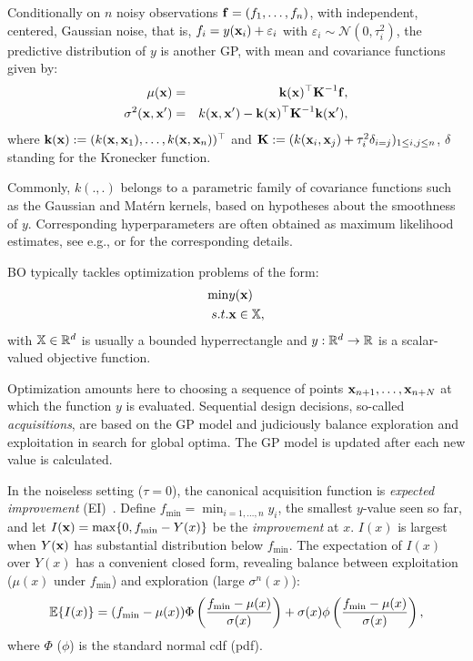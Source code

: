 Conditionally on $n$ noisy observations $\mathbf{f} = (f_1, \ldots, f_n)$, with independent, centered, Gaussian noise,
that is, $f_i = y(\mathbf{x}_i) + \varepsilon_i$ with $\varepsilon_i \sim \mathcal{N}(0, \tau_i^2)$,
the predictive distribution of $y$ is another GP, with mean and covariance functions given by:
\begin{eqnarray}
\mu(\mathbf{x}) & =& \textbf{k}(\mathbf{x})^\top \textbf{K}^{-1} \mathbf{f},  \\
\sigma^2(\mathbf{x}, \mathbf{x}') & =& k(\mathbf{x}, \mathbf{x}') - \textbf{k}(\mathbf{x})^\top \textbf{K}^{-1} \textbf{k}(\mathbf{x}'),
\end{eqnarray}
where $\textbf{k}(\mathbf{x}) := (k(\mathbf{x}, \mathbf{x}_1), \dots, k(\mathbf{x}, \mathbf{x}_n))^\top$ and $\textbf{K} := (k(\mathbf{x}_i, \mathbf{x}_j) + \tau_i^2 \delta_{i=j})_{1 \leq i,j \leq n}$,
$\delta$ standing for the Kronecker function.

Commonly, $k(.,.)$ belongs to a parametric family of covariance functions such as the Gaussian and Mat\'ern kernels, 
based on hypotheses about the smoothness of $y$. Corresponding hyperparameters are often obtained as maximum likelihood estimates, 
see e.g., \citet{Rasmussen2006} or \citet{Roustant2012} for the corresponding details.   

BO typically tackles optimization problems of the form:
\begin{eqnarray*}
 \min & y(\mathbf{x}) \\
 s.t. & \mathbf{x} \in \mathbb{X},
\end{eqnarray*}
with $\mathbb{X} \in \mathbb{R}^d$ is usually a bounded hyperrectangle and $y:\mathbb{R}^d \rightarrow \mathbb{R}$ is a scalar-valued objective function.

Optimization amounts here to choosing a sequence of points $\mathbf{x}_{n+1}, \ldots, \mathbf{x}_{n+N}$ at which the function $y$ is evaluated.
Sequential design decisions, so-called {\em acquisitions}, are based on the GP model and judiciously balance exploration and exploitation 
in search for global optima. The GP model is updated after each new value is calculated.

In the noiseless setting ($\tau=0$), the canonical acquisition function is {\em expected improvement} (EI)~\cite{jones1998efficient}. 
Define $f_{\min} = \min_{i=1,\ldots,n} y_i$, the smallest $y$-value seen so
far, and let $I(\mathbf{x}) = \max\{ 0, f_{\min} - Y(x) \}$
be the {\em improvement} at $x$.  $I(x)$ is largest when $Y(\mathbf{x})$ has
substantial distribution below $f_{\min}$. 
The expectation of $I(x)$ over $Y(x)$ has a convenient closed form,
revealing balance between exploitation ($\mu(x)$ under $f_{\min}$) and
exploration (large $\sigma^{n}(x)$):
\begin{equation}
\mathbb{E} \{I(x)\} = (f_{\min} - \mu(x)) \Phi\left(
\frac{f_{\min} - \mu(x)}{\sigma(x)}\right)
+ \sigma(x) \phi\left(
\frac{f_{\min} - \mu(x)}{\sigma(x)}\right),
\label{eq:ei}
\end{equation}
where $\Phi$ ($\phi$) is the standard normal cdf (pdf).

